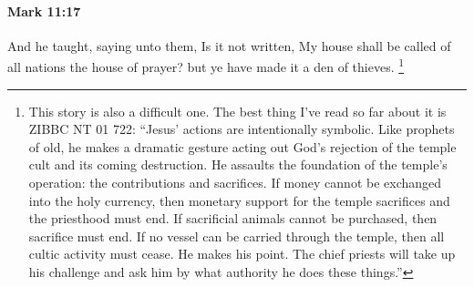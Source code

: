 			\begin{framed}
			\scriptsize
				\begin{compactdesc}
					\item[SBLG] 
				\end{compactdesc}
			\end{framed}

		\paragraph{Mark 11:17} %
			\label{MARK-11-17}

			And he taught, saying unto them, Is it not written, My house shall be called of all nations the house of prayer? but ye have made it a den of thieves.%
				\footnote{%
					This story is also a difficult one. The best thing I've read so far about it is ZIBBC NT 01 722: ``Jesus' actions are intentionally symbolic. Like prophets of old, he makes a dramatic gesture acting out God's rejection of the temple cult and its coming destruction. He assaults the foundation of the temple's operation: the contributions and sacrifices. If money cannot be exchanged into the holy currency, then monetary support for the temple sacrifices and the priesthood must end. If sacrificial animals cannot be purchased, then sacrifice must end. If no vessel can be carried through the temple, then all cultic activity must cease. He makes his point. The chief priests will take up his challenge and ask him by what authority he does these things.'' 
					}


